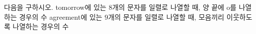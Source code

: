 다음을 구하시오.
 tomorrow에 있는 $8$개의 문자를 일렬로 나열할 때, 양 끝에 o를 나열하는 경우의 수
 agreement에 있는 $9$개의 문자를 일렬로 나열할 때, 모음끼리 이웃하도록 나열하는 경우의 수

